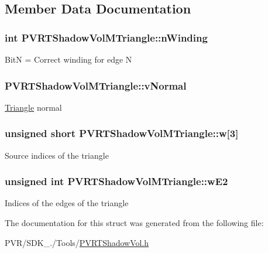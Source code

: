  

\subsection{Member Data Documentation}
\hypertarget{struct_p_v_r_t_shadow_vol_m_triangle_a56ad15abef4e469aa0bc95a79dc5c2d7}{
\subsubsection[{n\+Winding}]{\setlength{\rightskip}{0pt plus 5cm}int P\+V\+R\+T\+Shadow\+Vol\+M\+Triangle\+::n\+Winding}}\label{struct_p_v_r_t_shadow_vol_m_triangle_a56ad15abef4e469aa0bc95a79dc5c2d7}
Bit\+N = Correct winding for edge N \hypertarget{struct_p_v_r_t_shadow_vol_m_triangle_abc0e17976aaaef2363c686f60e969b93}{
\subsubsection[{v\+Normal}]{ P\+V\+R\+T\+Shadow\+Vol\+M\+Triangle\+::v\+Normal}}\label{struct_p_v_r_t_shadow_vol_m_triangle_abc0e17976aaaef2363c686f60e969b93}
\hyperlink{class_triangle}{Triangle} normal \hypertarget{struct_p_v_r_t_shadow_vol_m_triangle_a6be596dd8fcae5d40b641eb237f9a7c2}{
\subsubsection[{w}]{\setlength{\rightskip}{0pt plus 5cm}unsigned short P\+V\+R\+T\+Shadow\+Vol\+M\+Triangle\+::w\mbox{[}3\mbox{]}}}\label{struct_p_v_r_t_shadow_vol_m_triangle_a6be596dd8fcae5d40b641eb237f9a7c2}
Source indices of the triangle \hypertarget{struct_p_v_r_t_shadow_vol_m_triangle_ae8fe2a0a55201e8307281de86d23919c}{
\subsubsection[{w\+E2}]{\setlength{\rightskip}{0pt plus 5cm}unsigned int P\+V\+R\+T\+Shadow\+Vol\+M\+Triangle\+::w\+E2}}\label{struct_p_v_r_t_shadow_vol_m_triangle_ae8fe2a0a55201e8307281de86d23919c}
Indices of the edges of the triangle 

The documentation for this struct was generated from the following file\+:\begin{DoxyCompactItemize}
\item 
P\+V\+R/\+S\+D\+K\+\_./\+Tools/\hyperlink{_p_v_r_t_shadow_vol_8h}{P\+V\+R\+T\+Shadow\+Vol.\+h}\end{DoxyCompactItemize}
